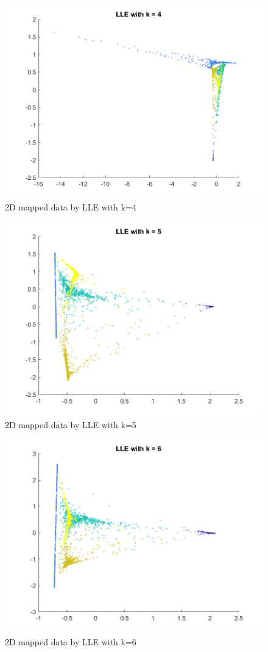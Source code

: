 \documentclass{article}
\begin{document}
{    \begin{figure}[H]
        \centering
        \includegraphics[width = 0.8\linewidth]{Q2/LLE_4.png}
        \caption{2D mapped data by LLE with k=4}
    \end{figure}

    \begin{figure}[H]
        \centering
        \includegraphics[width = 0.8\linewidth]{Q2/LLE_5.png}
        \caption{2D mapped data by LLE with k=5}
    \end{figure}

    \begin{figure}[H]
        \centering
        \includegraphics[width = 0.8\linewidth]{Q2/LLE_6.png}
        \caption{2D mapped data by LLE with k=6}
    \end{figure}

}
\end{document}
